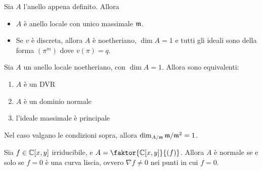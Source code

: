 \begin{proposition}
    Sia $A$ l'anello appena definito. Allora
    \begin{itemize}
        \item $A$ è anello locale con unico massimale $\mathfrak{m}$.
        \item Se $v$ è discreta, allora $A$ è noetheriano, $\dim A=1$ e tutti gli ideali sono della forma $(\pi^m)$ dove $v(\pi)=q$.
    \end{itemize}
\end{proposition}

\begin{theorem}
    Sia $A$ un anello locale noetheriano, con $\dim A=1$. Allora sono equivalenti:
    \begin{enumerate}
        \item $A$ è un DVR
        \item $A$ è un dominio normale
        \item l'ideale massimale è principale
    \end{enumerate}
\end{theorem}

\begin{oss}
    Nel caso valgano le condizioni sopra, allora $\dim_{A/\mathfrak{m}}\mathfrak{m}/\mathfrak{m}^2=1$.
\end{oss}

\begin{proposition}
    Sia $f\in\mathbb{C}[x,y]$ irriducibile, e $A=\faktor{\C[x,y]}{(f)}$. Allora $A$ è normale se e solo se $f=0$ è una curva liscia, ovvero $\nabla f\neq 0$ nei punti in cui $f=0$.
\end{proposition}


